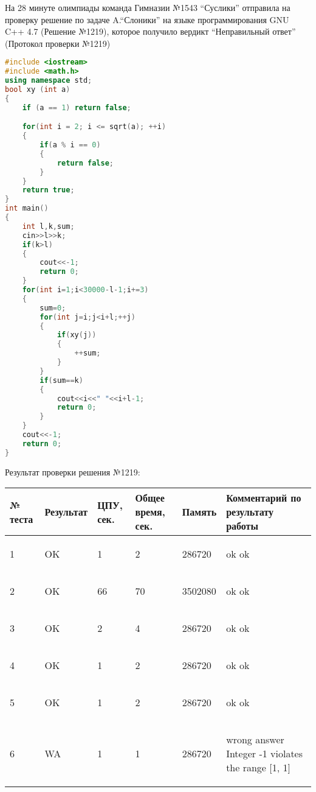 На 28 минуте олимпиады команда Гимназии №1543 ``Суслики'' отправила на проверку решение по задаче A.``Слоники'' на языке программирования GNU C++ 4.7 (Решение №1219), которое получило вердикт ``Неправильный ответ'' (Протокол проверки №1219)
\begin{lstlisting}[language=c++, label=r1219, caption=Решение №1219]
#include <iostream>
#include <math.h>
using namespace std;
bool xy (int a)
{
    if (a == 1) return false;

    for(int i = 2; i <= sqrt(a); ++i)
    {
        if(a % i == 0)
        {
            return false;
        }
    }
    return true;
}
int main()
{
    int l,k,sum;
    cin>>l>>k;
    if(k>l)
    {
        cout<<-1;
        return 0;
    }
    for(int i=1;i<30000-l-1;i+=3)
    {
        sum=0;
        for(int j=i;j<i+l;++j)
        {
            if(xy(j))
            {
                ++sum;
            }
        }
        if(sum==k)
        {
            cout<<i<<" "<<i+l-1;
            return 0;
        }
    }
    cout<<-1;
    return 0;
}

\end{lstlisting}


Результат проверки решения №1219:

 \begin{longtable}{|p{1cm}|p{2.5cm}|p{1.5cm}|p{2.5cm}|p{1.5cm}|p{5cm}|}\hline
№ теста & Результат & ЦПУ, сек. & Общее время, сек. & Память & Комментарий по результату работы \\ \hline 
1 & OK & 1 & 2 & 286720 & \begin{spverbatim}ok ok

\end{spverbatim}  \\ \hline
2 & OK & 66 & 70 & 3502080 & \begin{spverbatim}ok ok

\end{spverbatim}  \\ \hline
3 & OK & 2 & 4 & 286720 & \begin{spverbatim}ok ok

\end{spverbatim}  \\ \hline
4 & OK & 1 & 2 & 286720 & \begin{spverbatim}ok ok

\end{spverbatim}  \\ \hline
5 & OK & 1 & 2 & 286720 & \begin{spverbatim}ok ok

\end{spverbatim}  \\ \hline
6 & WA & 1 & 1 & 286720 & \begin{spverbatim}wrong answer Integer -1 violates the range [1, 1]

\end{spverbatim}  \\ \hline
\end{longtable}